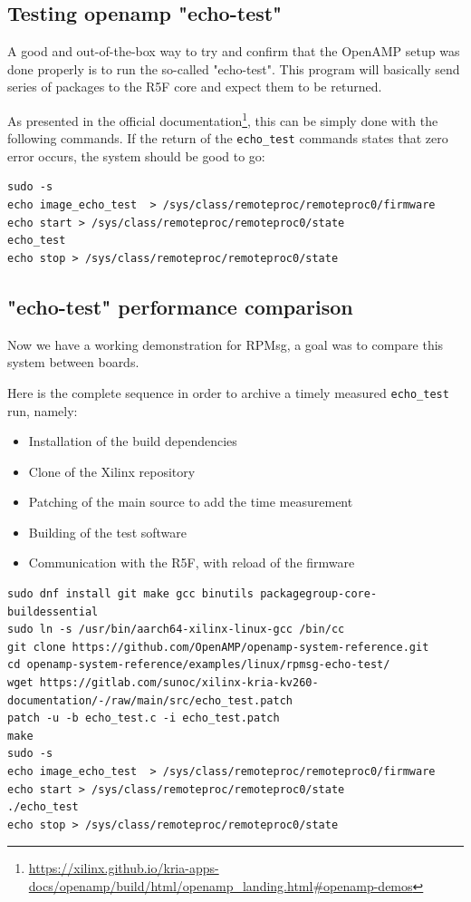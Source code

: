 \documentclass[10pt]{article}
\begin{document}
\subsection{Testing openamp "echo-test"}
\label{sec:orge324c3a}
A good and out-of-the-box way to try and confirm that the OpenAMP setup was done
properly is to run the so-called "echo-test". This program will basically send
series of packages to the R5F core and expect them to be returned.

As presented in the official documentation\footnote{\url{https://xilinx.github.io/kria-apps-docs/openamp/build/html/openamp\_landing.html\#openamp-demos}}, this can be simply done with
the following commands. If the return of the \texttt{echo\_test} commands states that zero
error occurs, the system should be good to go:
\begin{verbatim}
sudo -s
echo image_echo_test  > /sys/class/remoteproc/remoteproc0/firmware
echo start > /sys/class/remoteproc/remoteproc0/state
echo_test
echo stop > /sys/class/remoteproc/remoteproc0/state
\end{verbatim}

\subsection{"echo-test" performance comparison}
\label{sec:org8596b5e}

Now we have a working demonstration for RPMsg, a goal was to compare this system between boards.

Here is the complete sequence in order to archive a timely measured \texttt{echo\_test} run, namely:
\begin{itemize}
\item Installation of the build dependencies
\item Clone of the Xilinx repository
\item Patching of the main source to add the time measurement
\item Building of the test software
\item Communication with the R5F, with reload of the firmware
\end{itemize}
\begin{verbatim}
sudo dnf install git make gcc binutils packagegroup-core-buildessential
sudo ln -s /usr/bin/aarch64-xilinx-linux-gcc /bin/cc
git clone https://github.com/OpenAMP/openamp-system-reference.git
cd openamp-system-reference/examples/linux/rpmsg-echo-test/
wget https://gitlab.com/sunoc/xilinx-kria-kv260-documentation/-/raw/main/src/echo_test.patch
patch -u -b echo_test.c -i echo_test.patch
make
sudo -s
echo image_echo_test  > /sys/class/remoteproc/remoteproc0/firmware
echo start > /sys/class/remoteproc/remoteproc0/state
./echo_test
echo stop > /sys/class/remoteproc/remoteproc0/state
\end{verbatim}
\end{document}
